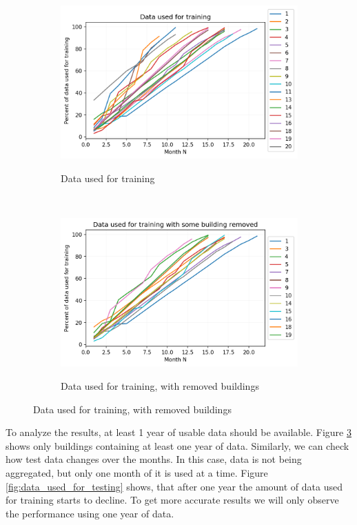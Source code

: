 \begin{figure}[H]
	\begin{subfigure}{.5\textwidth}
        \caption{Data used for training}
        \includegraphics[width=1\textwidth]{Figures/EC/DYN/data_used_for_training_all.png}
        \label{fig:data_used_for_training}
    \end{subfigure}
    ~
    \begin{subfigure}{.5\textwidth}
        \caption{Data used for training, with removed buildings}
        \includegraphics[width=1\textwidth]{Figures/EC/DYN/data_used_for_training_removed_short.png}
        \label{fig:data_used_for_training_removed}
    \end{subfigure}
\end{figure}

To analyze the results, at least 1 year of usable data should be available. 
Figure \ref{fig:data_used_for_training_removed} shows only buildings containing at least one year of data.
Similarly, we can check how test data changes over the months. 
In this case, data is not being aggregated, but only one month of it is used at a time.
Figure \ref{fig:data_used_for_testing} shows, that after one year
the amount of data used for training starts to decline. 
To get more accurate results we will only observe the performance using one year of data. 


